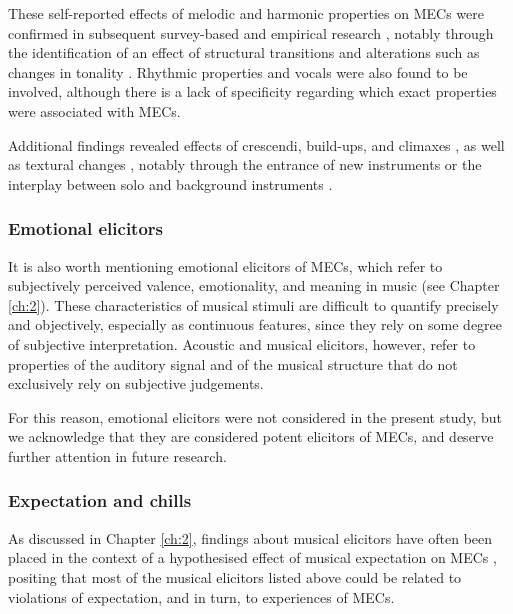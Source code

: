 These self-reported effects of melodic and harmonic properties on MECs were confirmed in subsequent survey-based and empirical research \parencite{auricchio2017,bannister2020a,bannister2018,guhn2007,mlejnek2013,schurtz2012}, notably through the identification of an effect of structural transitions and alterations such as changes in tonality \parencite{bannister2020a}. Rhythmic properties \parencite{schurtz2012,solberg2019} and vocals \parencite{bannister2020a,schurtz2012} were also found to be involved, although there is a lack of specificity regarding which exact properties were associated with MECs. 

Additional findings revealed effects of crescendi, build-ups, and climaxes \parencite{auricchio2017,bannister2020a,bannister2018,panksepp1995,polo2017,solberg2019}, as well as textural changes \parencite{auricchio2017,polo2017,sloboda1991,solberg2019}, notably through the entrance of new instruments or the interplay between solo and background instruments \parencite{auricchio2017,bannister2020a,bannister2018,goodchild2019,guhn2007,mlejnek2013}.

\subsubsection{Emotional elicitors}

It is also worth mentioning emotional elicitors of MECs, which refer to subjectively perceived valence, emotionality, and meaning in music (see Chapter \ref{ch:2}). These characteristics of musical stimuli are difficult to quantify precisely and objectively, especially as continuous features, since they rely on some degree of subjective interpretation. Acoustic and musical elicitors, however, refer to properties of the auditory signal and of the musical structure that do not exclusively rely on subjective judgements.

For this reason, emotional elicitors were not considered in the present study, but we acknowledge that they are considered potent elicitors of MECs, and deserve further attention in future research.

\subsubsection{Expectation and chills}

As discussed in Chapter \ref{ch:2}, findings about musical elicitors have often been placed in the context of a hypothesised effect of musical expectation on MECs \parencite{harrison2014,huron2006,huron2010,juslin2008,juslin2013,mcdermott2012,mencke2019,pearce2012,salimpoor2011,sloboda1991}, positing that most of the musical elicitors listed above could be related to violations of expectation, and in turn, to experiences of MECs.

